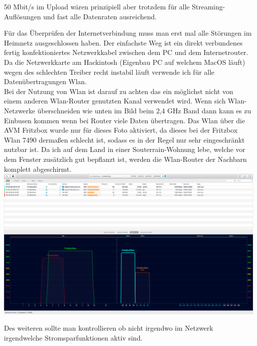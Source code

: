 50 Mbit/s im Upload wären prinzipiell aber trotzdem für alle Streaming-Auflösungen und fast alle Datenraten ausreichend.




Für das Überprüfen der Internetverbindung muss man erst mal alle Störungen im Heimnetz ausgeschlossen haben. Der einfachste Weg ist ein direkt verbundenes fertig konfektioniertes Netzwerkkabel zwischen dem PC und dem Internetrouter. Da die Netzwerkkarte am Hackintosh (Eigenbau PC auf welchem MacOS läuft) wegen des schlechten Treiber recht instabil läuft verwende ich für alle Datenübertragungen Wlan.\\
Bei der Nutzung von Wlan ist darauf zu achten das ein möglichst nicht von einem anderen Wlan-Router genutzten Kanal verwendet wird. Wenn sich Wlan-Netzwerke überschneiden wie unten im Bild beim 2,4 GHz Band dann kann es zu Einbusen kommen wenn bei Router viele Daten übertragen. Das Wlan über die AVM Fritzbox wurde nur für dieses Foto aktiviert, da dieses bei der Fritzbox Wlan 7490 dermaßen schlecht ist, sodass es in der Regel nur sehr eingeschränkt nutzbar ist.
Da ich auf dem Land in einer Souterrain-Wohnung lebe, welche vor dem Fenster zusätzlich gut bepflanzt ist, werden die Wlan-Router der Nachbarn komplett abgeschirmt.\\


\includegraphics[width=\textwidth]{./pictures/wifiNetworks.png}

Des weiteren sollte man kontrollieren ob nicht irgendwo im Netzwerk irgendwelche Stromsparfunktionen aktiv sind.

